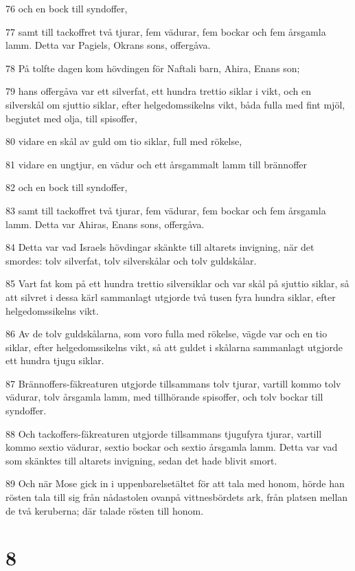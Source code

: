 \par 76 och en bock till syndoffer,
\par 77 samt till tackoffret två tjurar, fem vädurar, fem bockar och fem årsgamla lamm. Detta var Pagiels, Okrans sons, offergåva.
\par 78 På tolfte dagen kom hövdingen för Naftali barn, Ahira, Enans son;
\par 79 hans offergåva var ett silverfat, ett hundra trettio siklar i vikt, och en silverskål om sjuttio siklar, efter helgedomssikelns vikt, båda fulla med fint mjöl, begjutet med olja, till spisoffer,
\par 80 vidare en skål av guld om tio siklar, full med rökelse,
\par 81 vidare en ungtjur, en vädur och ett årsgammalt lamm till brännoffer
\par 82 och en bock till syndoffer,
\par 83 samt till tackoffret två tjurar, fem vädurar, fem bockar och fem årsgamla lamm. Detta var Ahiras, Enans sons, offergåva.
\par 84 Detta var vad Israels hövdingar skänkte till altarets invigning, när det smordes: tolv silverfat, tolv silverskålar och tolv guldskålar.
\par 85 Vart fat kom på ett hundra trettio silversiklar och var skål på sjuttio siklar, så att silvret i dessa kärl sammanlagt utgjorde två tusen fyra hundra siklar, efter helgedomssikelns vikt.
\par 86 Av de tolv guldskålarna, som voro fulla med rökelse, vägde var och en tio siklar, efter helgedomssikelns vikt, så att guldet i skålarna sammanlagt utgjorde ett hundra tjugu siklar.
\par 87 Brännoffers-fäkreaturen utgjorde tillsammans tolv tjurar, vartill kommo tolv vädurar, tolv årsgamla lamm, med tillhörande spisoffer, och tolv bockar till syndoffer.
\par 88 Och tackoffers-fäkreaturen utgjorde tillsammans tjugufyra tjurar, vartill kommo sextio vädurar, sextio bockar och sextio årsgamla lamm. Detta var vad som skänktes till altarets invigning, sedan det hade blivit smort.
\par 89 Och när Mose gick in i uppenbarelsetältet för att tala med honom, hörde han rösten tala till sig från nådastolen ovanpå vittnesbördets ark, från platsen mellan de två keruberna; där talade rösten till honom.

\chapter{8}

